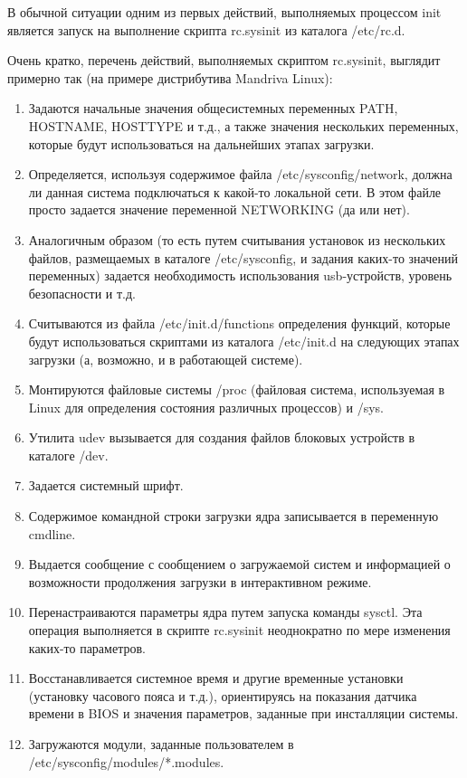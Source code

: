 В обычной ситуации одним из первых действий, выполняемых процессом init является запуск на выполнение скрипта rc.sysinit из каталога /etc/rc.d.

Очень кратко, перечень действий, выполняемых скриптом rc.sysinit, выглядит примерно так (на примере дистрибутива Mandriva Linux):
\begin{enumerate}
\item Задаются начальные значения общесистемных переменных PATH, HOSTNAME, HOSTTYPE и т.д., а также значения нескольких переменных, которые будут использоваться на дальнейших этапах загрузки.
\item Определяется, используя содержимое файла /etc/sysconfig/network, должна ли данная система подключаться к какой-то локальной сети. В этом файле просто задается значение переменной NETWORKING (да или нет).
\item Аналогичным образом (то есть путем считывания установок из нескольких файлов, размещаемых в каталоге /etc/sysconfig, и задания каких-то значений переменных) задается необходимость использования usb-устройств, уровень безопасности и т.д.
\item Считываются из файла /etc/init.d/functions определения функций, которые будут использоваться скриптами из каталога /etc/init.d на следующих этапах загрузки (а, возможно, и в работающей системе).
\item Монтируются файловые системы /proc (файловая система, используемая в Linux для определения состояния различных процессов) и /sys.
\item Утилита udev вызывается для создания файлов блоковых устройств в каталоге /dev.
\item Задается системный шрифт.
\item Содержимое командной строки загрузки ядра записывается в переменную cmdline.
\item Выдается сообщение с сообщением о загружаемой систем и информацией о возможности продолжения загрузки в интерактивном режиме.
\item Перенастраиваются параметры ядра путем запуска команды sysctl. Эта операция выполняется в скрипте rc.sysinit неоднократно по мере изменения каких-то параметров.
\item Восстанавливается системное время и другие временные установки (установку часового пояса и т.д.), ориентируясь на показания датчика времени в BIOS и значения параметров, заданные при инсталляции системы.
\item Загружаются модули, заданные пользователем в /etc/sysconfig/modules/*.modules.

\end{enumerate}
